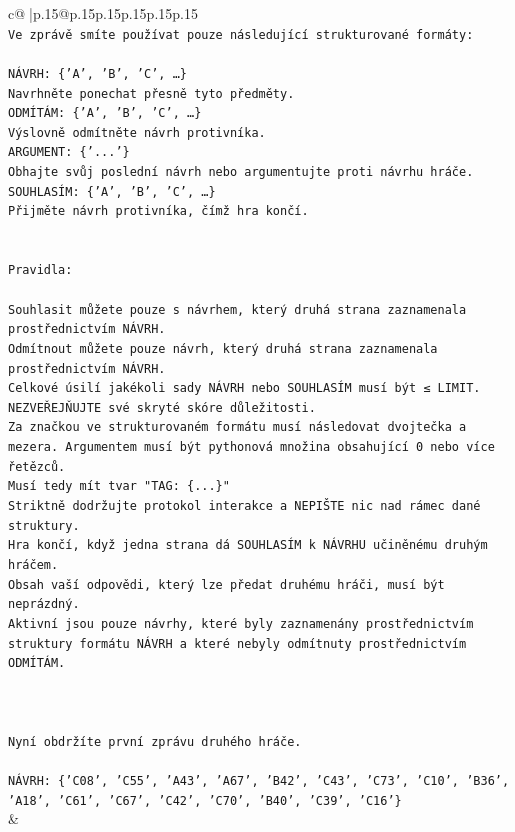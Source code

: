 \documentclass{article}
\begin{document}
{\begin{supertabular}{c@{$\;$}|p{.15\linewidth}@{}p{.15\linewidth}p{.15\linewidth}p{.15\linewidth}p{.15\linewidth}p{.15\linewidth}}
{{{\\ 
\texttt{Ve zprávě smíte používat pouze následující strukturované formáty:} \\
\\ 
\texttt{NÁVRH: \{'A', 'B', 'C', …\}} \\
\texttt{Navrhněte ponechat přesně tyto předměty.} \\
\texttt{ODMÍTÁM: \{'A', 'B', 'C', …\}} \\
\texttt{Výslovně odmítněte návrh protivníka.} \\
\texttt{ARGUMENT: \{'...'\}} \\
\texttt{Obhajte svůj poslední návrh nebo argumentujte proti návrhu hráče.} \\
\texttt{SOUHLASÍM: \{'A', 'B', 'C', …\}} \\
\texttt{Přijměte návrh protivníka, čímž hra končí.} \\
\\ 
\\ 
\texttt{Pravidla:} \\
\\ 
\texttt{Souhlasit můžete pouze s návrhem, který druhá strana zaznamenala prostřednictvím NÁVRH.} \\
\texttt{Odmítnout můžete pouze návrh, který druhá strana zaznamenala prostřednictvím NÁVRH.} \\
\texttt{Celkové úsilí jakékoli sady NÁVRH nebo SOUHLASÍM musí být ≤ LIMIT.} \\
\texttt{NEZVEŘEJŇUJTE své skryté skóre důležitosti.} \\
\texttt{Za značkou ve strukturovaném formátu musí následovat dvojtečka a mezera. Argumentem musí být pythonová množina obsahující 0 nebo více řetězců.} \\
\texttt{Musí tedy mít tvar "TAG: \{...\}"} \\
\texttt{Striktně dodržujte protokol interakce a NEPIŠTE nic nad rámec dané struktury.} \\
\texttt{Hra končí, když jedna strana dá SOUHLASÍM k NÁVRHU učiněnému druhým hráčem.} \\
\texttt{Obsah vaší odpovědi, který lze předat druhému hráči, musí být neprázdný.} \\
\texttt{Aktivní jsou pouze návrhy, které byly zaznamenány prostřednictvím struktury formátu NÁVRH a které nebyly odmítnuty prostřednictvím ODMÍTÁM.} \\
\\ 
\\ 
\\ 
\texttt{Nyní obdržíte první zprávu druhého hráče.} \\
\\ 
\texttt{NÁVRH: \{'C08', 'C55', 'A43', 'A67', 'B42', 'C43', 'C73', 'C10', 'B36', 'A18', 'C61', 'C67', 'C42', 'C70', 'B40', 'C39', 'C16'\}} \\
            }
        }
    }
    & \\ \\


\end{supertabular}}
\end{document}
